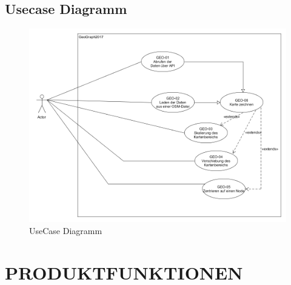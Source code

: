 	\subsection{Usecase Diagramm}
		\begin{figure}[H]
			\centering
			\includegraphics[width=0.7\linewidth]{images/Usecases}
			\caption{UseCase Diagramm}
			\label{fig:Usecase Diagramm}
		\end{figure}
		
		
	\section{\Large PRODUKTFUNKTIONEN}
